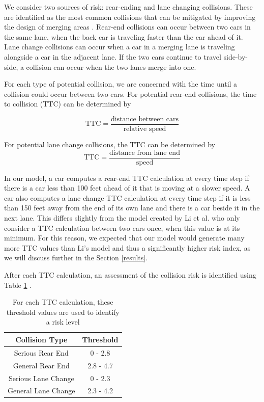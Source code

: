 \documentclass[a4paper, 11pt]{article}
\begin{document}
We consider two sources of risk: rear-ending and lane changing collisions. These are identified as the most common collisions that can be mitigated by improving the design of merging areas \cite{crashRisk}. Rear-end collisions can occur between two cars in the same lane, when the back car is traveling faster than the car ahead of it. Lane change collisions can occur when a car in a merging lane is traveling alongside a car in the adjacent lane. If the two cars continue to travel side-by-side, a collision can occur when the two lanes merge into one. 

For each type of potential collision, we are concerned with the time until a collision could occur between two cars. For potential rear-end collisions, the time to collision (TTC) can be determined by 

\begin{equation}
\mbox{TTC} = \frac{\mbox{distance between cars}}{\mbox{relative speed}}
\end{equation}

For potential lane change collisions, the TTC can be determined by
\begin{equation}
\mbox{TTC} = \frac{\mbox{distance from lane end}}{\mbox{speed}}
\end{equation}


In our model, a car computes a rear-end TTC calculation at every time step if there is a car less than 100 feet ahead of it that is moving at a slower speed. A car also computes a lane change TTC calculation at every time step if it is less than 150 feet away from the end of its own lane and there is a car beside it in the next lane. This differs slightly from the model created by Li et al. who only consider a TTC calculation between two cars once, when this value is at its minimum. For this reason, we expected that our model would generate many more TTC values than Li's model and thus a significantly higher risk index, as we will discuss further in the Section \ref{results}. 

After each TTC calculation, an assessment of the collision risk is identified using Table \ref{fig:ColRisk} \cite{crashRisk}. 
 
\begin{center}
\begin{table}[h!]
\centering
\begin{tabular}{|c|c|}
\hline
Collision Type & Threshold \\
\hline
Serious Rear End & 0 - 2.8 \\
\hline
General Rear End & 2.8 - 4.7 \\
\hline
Serious Lane Change & 0 - 2.3 \\
\hline
General Lane Change & 2.3 - 4.2 \\
\hline
\end{tabular}

\caption{For each TTC calculation, these threshold values are used to identify a risk level \cite{crashRisk}}
\label{fig:ColRisk}
\end{table}
\end{center}
\end{document}

